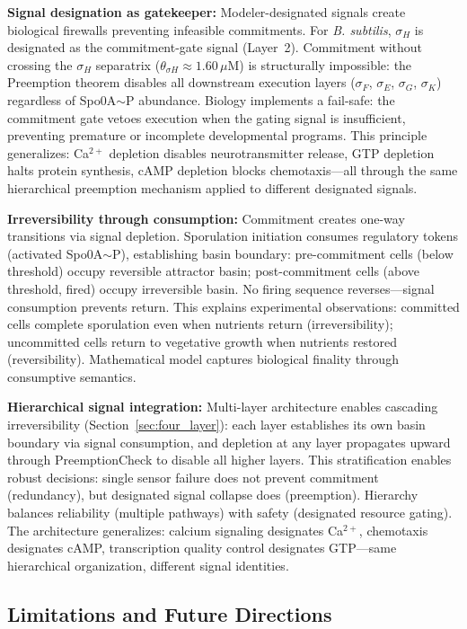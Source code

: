 \documentclass[10pt,letterpaper]{article}
\begin{document}
\textbf{Signal designation as gatekeeper:} Modeler-designated signals create biological firewalls preventing infeasible commitments. For \textit{B. subtilis}, $\sigma_H$ is designated as the commitment-gate signal (Layer~2). Commitment without crossing the $\sigma_H$ separatrix ($\theta_{\sigma H} \approx 1.60\,\mu$M) is structurally impossible: the Preemption theorem disables all downstream execution layers ($\sigma_F$, $\sigma_E$, $\sigma_G$, $\sigma_K$) regardless of Spo0A$\sim$P abundance. Biology implements a fail-safe: the commitment gate vetoes execution when the gating signal is insufficient, preventing premature or incomplete developmental programs. This principle generalizes: Ca$^{2+}$ depletion disables neurotransmitter release, GTP depletion halts protein synthesis, cAMP depletion blocks chemotaxis---all through the same hierarchical preemption mechanism applied to different designated signals.

\textbf{Irreversibility through consumption:} Commitment creates one-way transitions via signal depletion. Sporulation initiation consumes regulatory tokens (activated Spo0A$\sim$P), establishing basin boundary: pre-commitment cells (below threshold) occupy reversible attractor basin; post-commitment cells (above threshold, fired) occupy irreversible basin. No firing sequence reverses---signal consumption prevents return. This explains experimental observations: committed cells complete sporulation even when nutrients return (irreversibility); uncommitted cells return to vegetative growth when nutrients restored (reversibility). Mathematical model captures biological finality through consumptive semantics.

\textbf{Hierarchical signal integration:} Multi-layer architecture enables cascading irreversibility (Section~\ref{sec:four_layer}): each layer establishes its own basin boundary via signal consumption, and depletion at any layer propagates upward through PreemptionCheck to disable all higher layers. This stratification enables robust decisions: single sensor failure does not prevent commitment (redundancy), but designated signal collapse does (preemption). Hierarchy balances reliability (multiple pathways) with safety (designated resource gating). The architecture generalizes: calcium signaling designates Ca$^{2+}$, chemotaxis designates cAMP, transcription quality control designates GTP---same hierarchical organization, different signal identities.

\subsection{Limitations and Future Directions}
\end{document}
